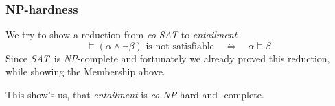 \subsubsection{NP-hardness}

We try to show a reduction from \textit{co-SAT} to \textit{entailment}%
\begin{equation*}
\models (\alpha \wedge \lnot \beta )\text{ is not satisfiable}\quad \iff
\quad \alpha \models \beta 
\end{equation*}%
Since \textit{SAT}\ is \textit{NP}-complete and fortunately we already
proved this reduction, while showing the Membership above.\newline

\noindent This show's us, that \textit{entailment} is \textit{co-NP}-hard
and -complete.

\bigskip 
